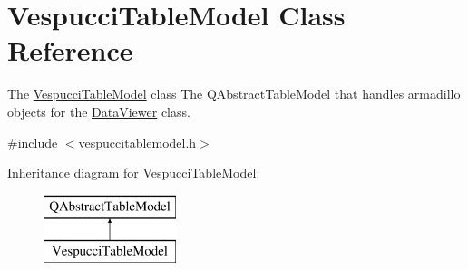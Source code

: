 \hypertarget{class_vespucci_table_model}{}\section{Vespucci\+Table\+Model Class Reference}
\label{class_vespucci_table_model}


The \hyperlink{class_vespucci_table_model}{Vespucci\+Table\+Model} class The Q\+Abstract\+Table\+Model that handles armadillo objects for the \hyperlink{class_data_viewer}{Data\+Viewer} class.  




{\ttfamily \#include $<$vespuccitablemodel.\+h$>$}

Inheritance diagram for Vespucci\+Table\+Model\+:\begin{figure}[H]
\begin{center}
\leavevmode
\includegraphics[height=2.000000cm]{class_vespucci_table_model}
\end{center}
\end{figure}
